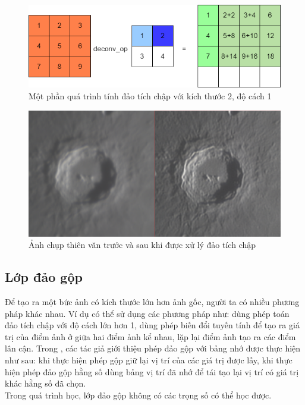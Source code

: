 \begin{figure}[h]
\centering
    \includegraphics[totalheight=3.5cm]{Images/deconv.png}
    \caption{Một phần quá trình tính đảo tích chập với kích thước 2, độ cách 1}
    \label{deconvExample}
\end{figure}

\begin{figure}[h]
\centering
    \includegraphics[totalheight=3.5cm]{Images/realConvEx.png}
    \caption{Ảnh chụp thiên văn trước và sau khi được xử lý đảo tích chập}
    \label{deconvRealExample}
\end{figure}

\subsection{Lớp đảo gộp}
Để tạo ra một bức ảnh có kích thước lớn hơn ảnh gốc, người ta có nhiều phương pháp khác nhau. Ví dụ có thể sử dụng các phương pháp như: dùng phép toán đảo tích chập với độ cách lớn hơn 1, dùng phép biến đổi tuyến tính để tạo ra giá trị của điểm ảnh ở giữa hai điểm ảnh kể nhau, lặp lại điểm ảnh tạo ra các điểm lân cận. Trong \cite{unpoolref}, các tác giả giới thiệu phép đảo gộp với bảng nhớ được thực hiện như sau: khi thực hiện phép gộp giữ lại vị trí của các giá trị được lấy, khi thực hiện phép đảo gộp hằng số dùng bảng vị trí đã nhớ để tái tạo lại vị trí có giá trị khác hằng số đã chọn.\\
Trong quá trình học, lớp đảo gộp không có các trọng số có thể học được.

